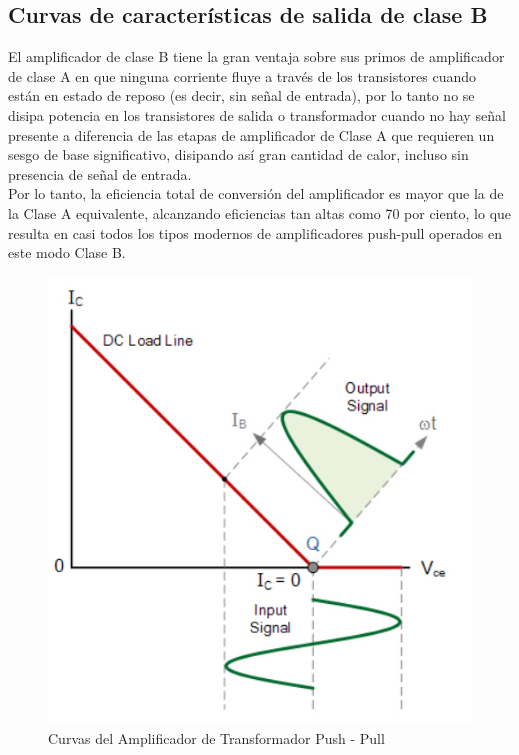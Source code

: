 \documentclass[12pt,a4paper]{article}
\begin{document}
\newpage
\subsection{Curvas de características de salida de clase B}
El amplificador de clase B tiene la gran ventaja sobre sus primos de amplificador de clase A en que ninguna corriente fluye a través de los transistores cuando están en estado de reposo (es decir, sin señal de entrada), por lo tanto no se disipa potencia en los transistores de salida o transformador cuando no hay señal presente a diferencia de las etapas de amplificador de Clase A que requieren un sesgo de base significativo, disipando así gran cantidad de calor, incluso sin presencia de señal de entrada.\\

Por lo tanto, la eficiencia total de conversión del amplificador es mayor que la de la Clase A equivalente, alcanzando eficiencias tan altas como 70 por ciento, lo que resulta en casi todos los tipos modernos de amplificadores push-pull operados en este modo Clase B.\\
\begin{figure}[hbtp]
\centering
\includegraphics[scale=0.5]{Pictures/4.jpg}
\caption{Curvas del Amplificador de Transformador Push - Pull}
\end{figure}
\end{document}
